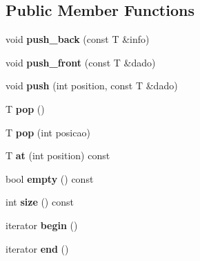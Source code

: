 \subsection*{Public Member Functions}
\begin{DoxyCompactItemize}
\item 
\hypertarget{classQueue_a3e03781c5f55e9f9ff862360aa33d9a9}{void {\bfseries push\-\_\-back} (const T \&info)}\label{classQueue_a3e03781c5f55e9f9ff862360aa33d9a9}

\item 
\hypertarget{classQueue_a01fbe357228d8f3d10c51def77f04647}{void {\bfseries push\-\_\-front} (const T \&dado)}\label{classQueue_a01fbe357228d8f3d10c51def77f04647}

\item 
\hypertarget{classQueue_a98c1f8cdb878cc1ad5d7f5dc13eec9b8}{void {\bfseries push} (int position, const T \&dado)}\label{classQueue_a98c1f8cdb878cc1ad5d7f5dc13eec9b8}

\item 
\hypertarget{classQueue_abeee018138cbb5226e5352a5788e23bd}{T {\bfseries pop} ()}\label{classQueue_abeee018138cbb5226e5352a5788e23bd}

\item 
\hypertarget{classQueue_a4836777845e48b56e4ddf04b3da677c9}{T {\bfseries pop} (int posicao)}\label{classQueue_a4836777845e48b56e4ddf04b3da677c9}

\item 
\hypertarget{classQueue_a91492afa6103be0ffdfcc886fc996b25}{T {\bfseries at} (int position) const }\label{classQueue_a91492afa6103be0ffdfcc886fc996b25}

\item 
\hypertarget{classQueue_a74e1442a08f38177e7dd7f7c8af22d30}{bool {\bfseries empty} () const }\label{classQueue_a74e1442a08f38177e7dd7f7c8af22d30}

\item 
\hypertarget{classQueue_ad13b6467a10f5b6b8b78716787a77fd4}{int {\bfseries size} () const }\label{classQueue_ad13b6467a10f5b6b8b78716787a77fd4}

\item 
\hypertarget{classQueue_a0f8479ac20e00d122558dce6c3c71473}{iterator {\bfseries begin} ()}\label{classQueue_a0f8479ac20e00d122558dce6c3c71473}

\item 
\hypertarget{classQueue_aae0dd33cf275e880bc244aeba0f2fc25}{iterator {\bfseries end} ()}\label{classQueue_aae0dd33cf275e880bc244aeba0f2fc25}


\end{DoxyCompactItemize}
